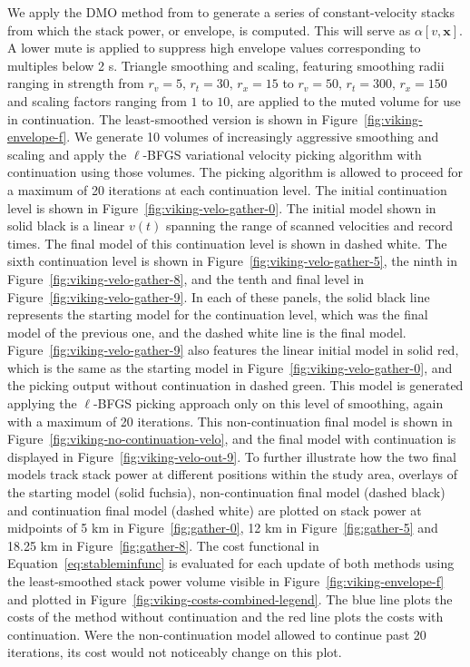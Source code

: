 We apply the DMO method from \cite{fowler-1988} to generate a series of constant-velocity stacks from which the stack power, or envelope, is computed.  This will serve as $\alpha[v,\mathbf{x}]$.  A lower mute is applied to suppress high envelope values corresponding to multiples below 2 s.   Triangle smoothing and scaling, featuring smoothing radii ranging in strength from $r_v=5,\,r_t=30,\,r_x=15$ to $r_v=50,\,r_t=300,\,r_x=150$ and scaling factors ranging from $1$ to $10$, are applied to the muted volume for use in continuation.  The least-smoothed version is shown in Figure~\ref{fig:viking-envelope-f}.  We generate 10 volumes of increasingly aggressive smoothing and scaling and apply the $\ell$-BFGS variational velocity picking algorithm with continuation using those volumes. The picking algorithm is allowed to proceed for a maximum of 20 iterations at each continuation level.  The initial continuation level is shown in Figure~\ref{fig:viking-velo-gather-0}.  The initial model shown in solid black is a linear $v(t)$ spanning the range of scanned velocities and record times.  The final model of this continuation level is shown in dashed white.  The sixth continuation level is shown in Figure~\ref{fig:viking-velo-gather-5}, the ninth in Figure~\ref{fig:viking-velo-gather-8}, and the tenth and final level in Figure~\ref{fig:viking-velo-gather-9}. In each of these panels, the solid black line represents the starting model for the continuation level, which was the final model of the previous one, and the dashed white line is the final model.  Figure~\ref{fig:viking-velo-gather-9} also features the linear initial model in solid red, which is the same as the starting model in Figure~\ref{fig:viking-velo-gather-0}, and the picking output without continuation in dashed green.  This model is generated applying the $\ell$-BFGS picking approach only on this level of smoothing, again with a maximum of 20 iterations. This non-continuation final model is shown in Figure~\ref{fig:viking-no-continuation-velo}, and the final model with continuation is displayed in Figure~\ref{fig:viking-velo-out-9}.  To further illustrate how the two final models track stack power at different positions within the study area, overlays of the starting model (solid fuchsia), non-continuation final model (dashed black) and continuation final model (dashed white) are plotted on stack power at midpoints of 5 km in Figure~\ref{fig:gather-0}, 12 km in Figure~\ref{fig:gather-5} and 18.25 km in Figure~\ref{fig:gather-8}. The cost functional in Equation~\ref{eq:stableminfunc} is evaluated for each update of both methods using the least-smoothed stack power volume visible in Figure~\ref{fig:viking-envelope-f} and plotted in Figure~\ref{fig:viking-costs-combined-legend}.  The blue line plots the costs of the method without continuation and the red line plots the costs with continuation. Were the non-continuation model allowed to continue past 20 iterations, its cost would not noticeably change on this plot.

